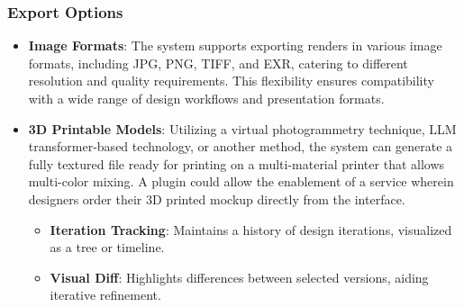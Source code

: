 \documentclass[12pt]{article}
\begin{document}
\subsubsection{Export Options}
\begin{itemize}
\item \textbf{Image Formats}: The system supports exporting renders in various image formats, including JPG, PNG, TIFF, and EXR, catering to different resolution and quality requirements. This flexibility ensures compatibility with a wide range of design workflows and presentation formats.
\item \textbf{3D Printable Models}: Utilizing a virtual photogrammetry technique, LLM transformer-based technology, or another method, the system can generate a fully textured file ready for printing on a multi-material printer that allows multi-color mixing. A plugin could allow the enablement of a service wherein designers order their 3D printed mockup directly from the interface.


\begin{itemize}
    \item \textbf{Iteration Tracking}: Maintains a history of design iterations, visualized as a tree or timeline.
    \item \textbf{Visual Diff}: Highlights differences between selected versions, aiding iterative refinement.
\end{itemize}


\end{itemize}
\end{document}
